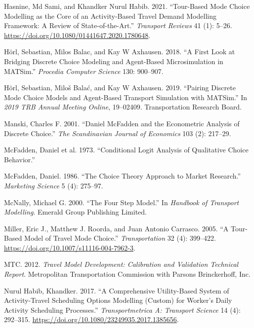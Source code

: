 \documentclass[12pt, oneside, openright]{byuthesis}
\newlength{\cslhangindent}
\newlength{\cslentryspacingunit} %
\newenvironment{CSLReferences}[2] %
 {%
  \setlength{\parindent}{0pt}
  \ifodd #1
  \let\oldpar\par
  \def\par{\hangindent=\cslhangindent\oldpar}
  \fi
  \setlength{\parskip}{#2\cslentryspacingunit}
 }%
 {}
\begin{document}
\begin{CSLReferences}{1}{0}
\leavevmode{}%
Hasnine, Md Sami, and Khandker Nurul Habib. 2021. {``Tour-Based Mode Choice Modelling as the Core of an Activity-Based Travel Demand Modelling Framework: A Review of State-of-the-Art.''} \emph{Transport Reviews} 41 (1): 5--26. \url{https://doi.org/10.1080/01441647.2020.1780648}.

\leavevmode{}%
Hörl, Sebastian, Milos Balac, and Kay W Axhausen. 2018. {``A First Look at Bridging Discrete Choice Modeling and Agent-Based Microsimulation in MATSim.''} \emph{Procedia Computer Science} 130: 900--907.

\leavevmode{}%
Hörl, Sebastian, Miloš Balać, and Kay W Axhausen. 2019. {``Pairing Discrete Mode Choice Models and Agent-Based Transport Simulation with MATSim.''} In \emph{2019 TRB Annual Meeting Online}, 19--02409. Transportation Research Board.

\leavevmode{}%
Manski, Charles F. 2001. {``Daniel McFadden and the Econometric Analysis of Discrete Choice.''} \emph{The Scandinavian Journal of Economics} 103 (2): 217--29.

\leavevmode{}%
McFadden, Daniel et al. 1973. {``Conditional Logit Analysis of Qualitative Choice Behavior.''}

\leavevmode{}%
McFadden, Daniel. 1986. {``The Choice Theory Approach to Market Research.''} \emph{Marketing Science} 5 (4): 275--97.

\leavevmode{}%
McNally, Michael G. 2000. {``The Four Step Model.''} In \emph{Handbook of Transport Modelling}. Emerald Group Publishing Limited.

\leavevmode{}%
Miller, Eric J., Matthew J. Roorda, and Juan Antonio Carrasco. 2005. {``A Tour-Based Model of Travel Mode Choice.''} \emph{Transportation} 32 (4): 399--422. \url{https://doi.org/10.1007/s11116-004-7962-3}.

\leavevmode{}%
MTC. 2012. \emph{Travel Model Development: Calibration and Validation Technical Report}. Metropolitan Transportation Commission with Parsons Brinckerhoff, Inc.

\leavevmode{}%
Nurul Habib, Khandker. 2017. {``A Comprehensive Utility-Based System of Activity-Travel Scheduling Options Modelling (Custom) for Worker's Daily Activity Scheduling Processes.''} \emph{Transportmetrica A: Transport Science} 14 (4): 292--315. \url{https://doi.org/10.1080/23249935.2017.1385656}.


\end{CSLReferences}
\end{document}
